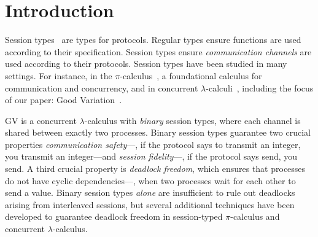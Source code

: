 \documentclass[main.tex]{subfiles}
\begin{document}
\section{Introduction}
Session types~\cite{honda93,takeuchihonda94,hondavasconcelos98} are types for protocols. Regular types ensure functions are used according to their specification. Session types ensure \emph{communication channels} are used according to their protocols. Session types have been studied in many settings. For instance, in the $\pi$-calculus~\cite{honda93,takeuchihonda94,hondavasconcelos98}, a foundational calculus for communication and concurrency, and in concurrent $\lambda$-calculi~\cite{gayvasconcelos10}, including the focus of our paper: Good Variation~\cite[GV]{wadler15,lindleymorris15}.

GV is a concurrent $\lambda$-calculus with \emph{binary} session types, where each channel is shared between exactly two processes. Binary session types guarantee two crucial properties \emph{communication safety}---\eg, if the protocol says to transmit an integer, you transmit an integer---and \emph{session fidelity}---\eg, if the protocol says send, you send. A third crucial property is \emph{deadlock freedom}, which ensures that processes do not have cyclic dependencies---\eg, when two processes wait for each other to send a value. Binary session types \emph{alone} are insufficient to rule out deadlocks arising from interleaved sessions, but several additional techniques have been developed to guarantee deadlock freedom in session-typed $\pi$-calculus and concurrent $\lambda$-calculus.
\end{document}
